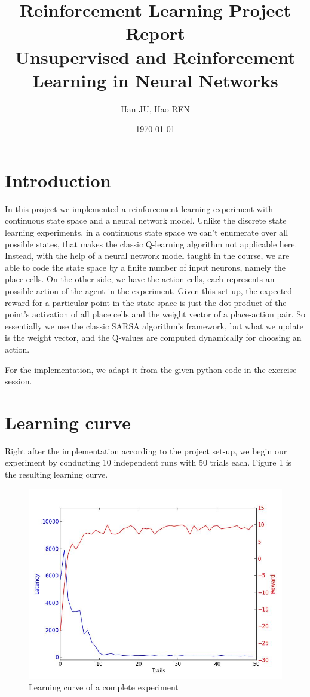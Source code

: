 \documentclass[a4paper, 12pt]{article}
\title{Reinforcement Learning Project Report \\ \vspace{0.5cm} \large Unsupervised and Reinforcement Learning in Neural Networks}
\author{Han JU, Hao REN}
\date{\today}
\begin{document}
\maketitle
\section{Introduction}

In this project we implemented a reinforcement learning experiment with
continuous state space and a neural network model. Unlike the discrete
state learning experiments, in a continuous state space we can't
enumerate over all possible states, that makes the classic Q-learning
algorithm not applicable here. Instead, with the help of a neural
network model taught in the course, we are able to code the state
space by a finite number of input neurons, namely the place cells. On
the other side, we have the action cells, each represents an possible
action of the agent in the experiment. Given this set up, the expected
reward for a particular point in the state space is just the dot
product of the point's activation of all place cells and the weight
vector of a place-action pair. So essentially we
use the classic SARSA algorithm's framework, but what we update is the
weight vector, and the Q-values are computed dynamically for choosing
an action.

For the implementation, we adapt it from the given python code in the
exercise session.

\section{Learning curve}

Right after the implementation according to the project set-up, we
begin our experiment by conducting 10 independent runs with 50 trials
each. Figure 1 is the resulting learning curve.

\begin{figure}[h]
\centering
\includegraphics[scale=0.4]{../figure/learning_curve.jpg}
\caption{Learning curve of a complete experiment}
\end{figure}
\end{document}
